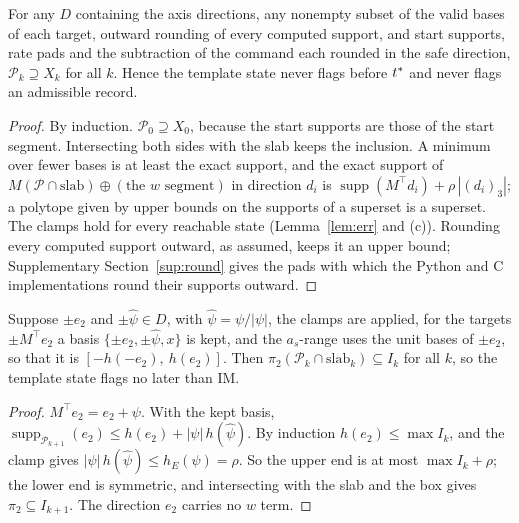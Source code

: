 \begin{theorem}[soundness]\label{thm:sound}
For any $D$ containing the axis directions, any nonempty subset of the valid bases of each target, outward
rounding of every computed support, and start supports, rate pads and the subtraction of the command each rounded in
the safe direction, $\mathcal{P}_k\supseteq X_k$ for all $k$. Hence the template state never flags before $t^{\ast}$ and
never flags an admissible record.
\end{theorem}
\begin{proof}
By induction. $\mathcal{P}_0\supseteq X_0$, because the start supports are those of the start segment. Intersecting
both sides with the slab keeps the inclusion. A minimum over fewer bases is at least the exact support, and the exact
support of $M(\mathcal{P}\cap\text{slab})\oplus(\text{the $w$ segment})$ in direction $d_i$ is
$\operatorname{supp}(M^\top d_i)+\rho\,|(d_i)_3|$; a polytope given by upper bounds on the supports of a superset is a
superset. The clamps hold for every reachable state (Lemma~\ref{lem:err} and (c)). Rounding every computed support outward, as
assumed, keeps it an upper bound; Supplementary Section~\ref{sup:round} gives the pads with which the Python and C
implementations round their supports outward.
\end{proof}

\begin{theorem}\label{thm:dom}
Suppose $\pm e_2$ and $\pm\hat\psi\in D$, with $\hat\psi = \psi/|\psi|$, the clamps are applied, for the targets
$\pm M^\top e_2$ a basis $\{\pm e_2, \pm\hat\psi, x\}$ is kept, and the $a_s$-range uses the unit bases of $\pm e_2$, so
that it is $[-h(-e_2),\ h(e_2)]$. Then $\pi_2(\mathcal{P}_k\cap\text{slab}_k)\subseteq I_k$
for all $k$, so the template state flags no later than IM.
\end{theorem}
\begin{proof}
$M^\top e_2 = e_2 + \psi$. With the kept basis, $\operatorname{supp}_{\mathcal{P}_{k+1}}(e_2)\le h(e_2) + |\psi|\,h(\hat\psi)$.
By induction $h(e_2)\le\max I_k$, and the clamp gives $|\psi|\,h(\hat\psi)\le h_E(\psi) = \rho$. So the upper end is at most
$\max I_k + \rho$; the lower end is symmetric, and intersecting with the slab and the box gives
$\pi_2\subseteq I_{k+1}$. The direction $e_2$ carries no $w$ term.
\end{proof}

